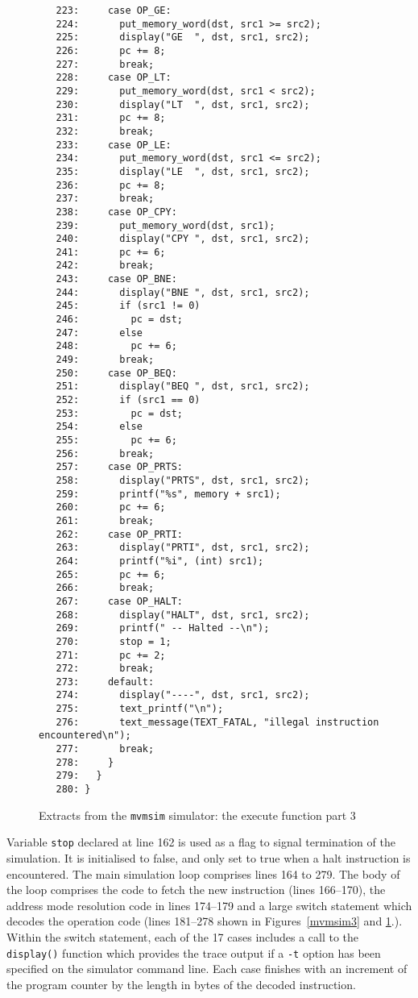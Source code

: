 \begin{figure}
\hspace*{0cm}
\begin{minipage}{30cm}
\footnotesize
\begin{verbatim}
   223:     case OP_GE:
   224:       put_memory_word(dst, src1 >= src2);
   225:       display("GE  ", dst, src1, src2);
   226:       pc += 8;
   227:       break;
   228:     case OP_LT:
   229:       put_memory_word(dst, src1 < src2);
   230:       display("LT  ", dst, src1, src2);
   231:       pc += 8;
   232:       break;
   233:     case OP_LE:
   234:       put_memory_word(dst, src1 <= src2);
   235:       display("LE  ", dst, src1, src2);
   236:       pc += 8;
   237:       break;
   238:     case OP_CPY:
   239:       put_memory_word(dst, src1);
   240:       display("CPY ", dst, src1, src2);
   241:       pc += 6;
   242:       break;
   243:     case OP_BNE:
   244:       display("BNE ", dst, src1, src2);
   245:       if (src1 != 0)
   246:         pc = dst;
   247:       else
   248:         pc += 6;
   249:       break;
   250:     case OP_BEQ:
   251:       display("BEQ ", dst, src1, src2);
   252:       if (src1 == 0)
   253:         pc = dst;
   254:       else
   255:         pc += 6;
   256:       break;
   257:     case OP_PRTS:
   258:       display("PRTS", dst, src1, src2);
   259:       printf("%s", memory + src1);
   260:       pc += 6;
   261:       break;
   262:     case OP_PRTI:
   263:       display("PRTI", dst, src1, src2);
   264:       printf("%i", (int) src1);
   265:       pc += 6;
   266:       break;
   267:     case OP_HALT:
   268:       display("HALT", dst, src1, src2);
   269:       printf(" -- Halted --\n");
   270:       stop = 1;
   271:       pc += 2;
   272:       break;
   273:     default:
   274:       display("----", dst, src1, src2);
   275:       text_printf("\n");
   276:       text_message(TEXT_FATAL, "illegal instruction encountered\n");
   277:       break;
   278:     }
   279:   }
   280: }
\end{verbatim}
\end{minipage}
\caption{Extracts from the {\tt mvmsim} simulator: the execute function part 3}
\label{mvmsim4}
\end{figure}

Variable {\tt stop} declared at line 162 is used as a flag to signal
termination of the simulation. It is initialised to false, and only set
to true when a {\sc halt} instruction is encountered. The main
simulation loop comprises lines 164 to 279. The body of the loop
comprises the code to fetch the new instruction (lines 166--170), the
address mode resolution code in lines 174--179 and a large switch
statement which decodes the operation code (lines 181--278 shown in
Figures~\ref{mvmsim3} and \ref{mvmsim4}.). Within the
switch statement, each of the 17 cases includes a call to the {\tt
display()} function which provides the trace output if a {\tt -t}
option has been specified on the simulator command line. Each case
finishes with an increment of the program counter by the length in bytes
of the decoded instruction.

